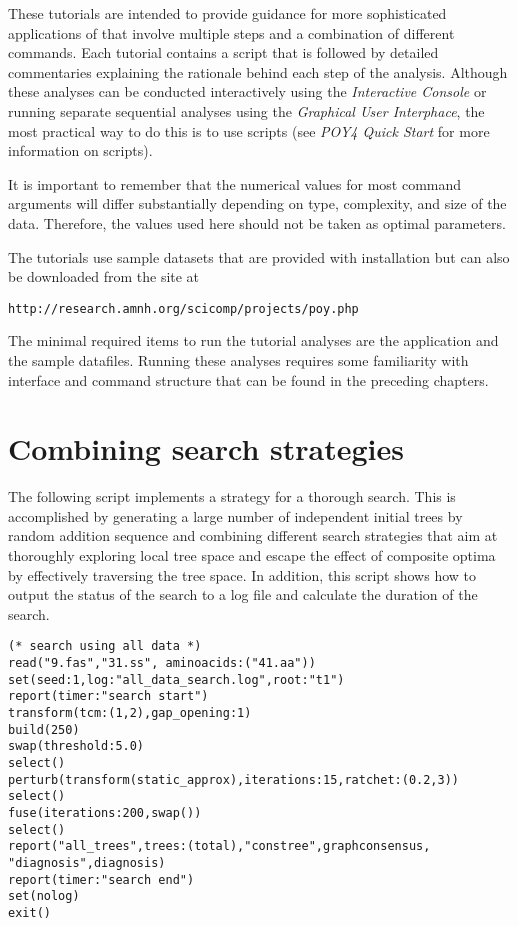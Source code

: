 These tutorials are intended to provide guidance for more sophisticated applications of \poy that involve multiple steps and a combination of different commands. Each tutorial contains a \poy script that is followed by detailed commentaries explaining the rationale behind each step of the analysis. Although these analyses can be conducted interactively using the \emph{Interactive Console} or running separate sequential analyses using the \emph{Graphical User Interphace}, the most practical way to do this is to use \poy scripts (see \emph{ POY4 Quick Start} for more information on \poy scripts).

It is important to remember that the numerical values for most command arguments will differ substantially depending on type, complexity, and size of the data. Therefore, the values used here should not be taken as optimal parameters.

The tutorials use sample datasets that are provided with \poy installation but can also be downloaded from the \poy site at
\begin{center}
\texttt{http://research.amnh.org/scicomp/projects/poy.php}
\end{center}
The minimal required items to run the tutorial analyses are the \poy application and the sample datafiles. Running these analyses requires some familiarity with \poy interface and command structure that can be found in the preceding chapters.

\section{Combining  search strategies}{\label{tutorial4.1}}
The following script implements a strategy for a thorough search. This is accomplished by generating a large number of independent initial trees by random addition sequence and combining different search strategies that aim at thoroughly exploring local tree space and escape the effect of composite optima by effectively traversing the tree space. In addition, this script shows how to output the status of the search to a log file and calculate the duration of the search. 

\begin{verbatim}
(* search using all data *)
read("9.fas","31.ss", aminoacids:("41.aa"))
set(seed:1,log:"all_data_search.log",root:"t1")
report(timer:"search start")
transform(tcm:(1,2),gap_opening:1)
build(250)
swap(threshold:5.0)
select()
perturb(transform(static_approx),iterations:15,ratchet:(0.2,3))
select()
fuse(iterations:200,swap())
select()
report("all_trees",trees:(total),"constree",graphconsensus,
"diagnosis",diagnosis)
report(timer:"search end")
set(nolog)
exit()
\end{verbatim}

